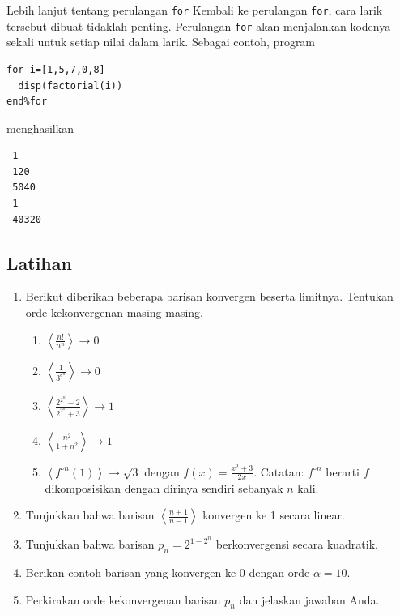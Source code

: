 {\begin{digression}{Lebih lanjut tentang perulangan \texttt{for}}
Kembali ke perulangan \texttt{for}, cara larik tersebut dibuat tidaklah
penting. Perulangan \texttt{for} akan menjalankan kodenya sekali untuk
setiap nilai dalam larik. Sebagai contoh, program\begin{verbatim}
for i=[1,5,7,0,8]
  disp(factorial(i))
end%for
\end{verbatim}menghasilkan\begin{verbatim}
 1
 120
 5040
 1
 40320
\end{verbatim}

\end{digression}

\noindent\startexercises

\subsection{Latihan}
\begin{enumerate}
\item Berikut diberikan beberapa barisan konvergen beserta limitnya. Tentukan
orde kekonvergenan masing-masing.

\begin{enumerate}
\item ${\displaystyle \left\langle \frac{n!}{n^{n}}\right\rangle \to0}$
\item \label{exc:convergence}${\displaystyle \left\langle \frac{1}{3^{e^{n}}}\right\rangle \to0}$ \hasasolution 
\item \label{exc:convergence-1}${\displaystyle \left\langle \frac{2^{2^{n}}-2}{2^{2^{n}}+3}\right\rangle \to1}$ \hasasolution 
\item \label{exc:convergence-2}${\displaystyle \left\langle \frac{n^{2}}{1+n^{2}}\right\rangle \to1}$ \hasananswer 
\item ${\displaystyle \left\langle f^{\circ n}(1)\right\rangle \to\sqrt{3}}$
dengan ${\displaystyle f(x)=\frac{x^{2}+3}{2x}}$. Catatan: $f^{\circ n}$
berarti $f$ dikomposisikan dengan dirinya sendiri sebanyak $n$ kali.
\end{enumerate}
\item \label{enu:linearConvergenceExample}Tunjukkan bahwa barisan ${\displaystyle \left\langle \frac{n+1}{n-1}\right\rangle }$
konvergen ke 1 secara linear.
\item Tunjukkan bahwa barisan $p_{n}=2^{1-2^{n}}$ berkonvergensi secara
kuadratik.
\item Berikan contoh barisan yang konvergen ke 0 dengan orde $\alpha=10$.
\item Perkirakan orde kekonvergenan barisan $p_{n}$ dan jelaskan jawaban
Anda.


\end{enumerate}}

